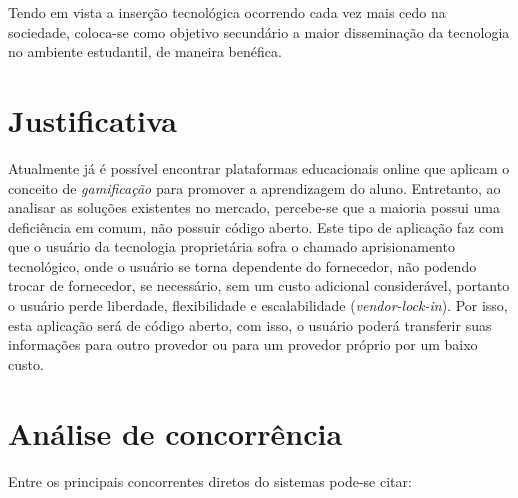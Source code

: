 Tendo em vista a inserção tecnológica ocorrendo cada vez mais cedo na sociedade, coloca-se como objetivo secundário a maior disseminação da tecnologia no ambiente estudantil, de maneira benéfica.

\section{Justificativa}
Atualmente já é possível encontrar plataformas educacionais online que aplicam o conceito de \textit{gamificação} para promover a aprendizagem do aluno. Entretanto, ao analisar as soluções existentes no mercado, percebe-se que a maioria possui uma deficiência em comum, não possuir código aberto. Este tipo de aplicação faz com que o usuário da tecnologia proprietária sofra o chamado aprisionamento tecnológico, onde o usuário se torna dependente do fornecedor, não podendo trocar de fornecedor, se necessário, sem um custo adicional considerável, portanto o usuário perde liberdade, flexibilidade e escalabilidade (\textit{\gls{vendor-lock-in}}). Por isso, esta aplicação será de código aberto, com isso, o usuário poderá transferir suas informações para outro provedor ou para um provedor próprio por um baixo custo.


\section{Análise de concorrência}
Entre os principais concorrentes diretos do sistemas pode-se citar:

